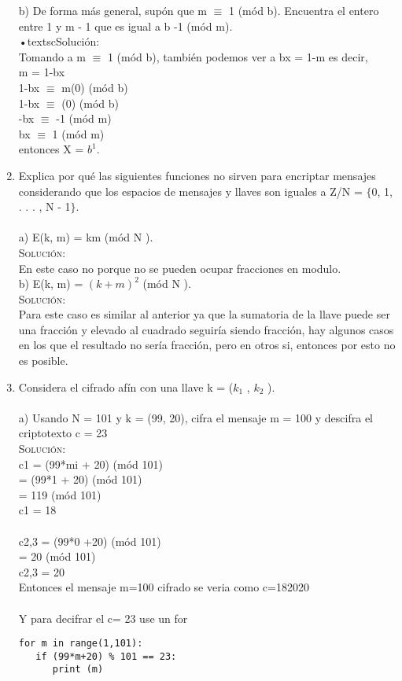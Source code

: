 \documentclass[letterpaper,10pt]{article}
\begin{document}
\begin{enumerate}
	b) De forma más general, supón que m $\equiv$ 1 (mód b). Encuentra el entero
entre 1 y m - 1 que es igual a b -1 (mód m).\\
	\textsc{•}textsc{Solución:}
	\\
	Tomando a m $\equiv$ 1 (mód b), también podemos ver a bx = 1-m es decir, \\
m = 1-bx\\
1-bx $\equiv$ m(0) (mód b)\\
1-bx $\equiv$ (0) (mód b)\\
-bx $\equiv$ -1 (mód m)\\
bx $\equiv$ 1 (mód m)\\
entonces X = $b^{1}$.\\
   	    
    \item Explica por qué las siguientes funciones no sirven para encriptar mensajes
considerando que los espacios de mensajes y llaves son iguales a Z/N =
$\lbrace$0, 1, . . . , N - 1$\rbrace$.
     \\ \\
    a) E(k, m) = km (mód N ).\\
    \textsc{Solución:}
	\\
	En este caso no porque no se pueden ocupar fracciones en modulo.\\
	
	b) E(k, m) = $(k + m)^{2}$ (mód N ).    \\
	\textsc{Solución:}
	\\
	Para este caso es similar al anterior ya que la sumatoria de la llave puede ser una fracción y elevado al cuadrado seguiría siendo fracción,
	hay algunos casos en los que el resultado no sería fracción, pero en otros si, entonces por esto no es posible.\\
   	    
    \item Considera el cifrado afín con una llave k = ($k_{1}$ , $k_{2}$ ).
     \\ \\
    a) Usando N = 101 y k = (99, 20), cifra el mensaje m = 100 y descifra el
criptotexto c = 23   \\  
    \textsc{Solución:}
	\\    
c1 = (99*mi + 20) (mód 101)\\
   = (99*1 + 20) (mód 101)\\
   = 119 (mód 101)\\
c1 = 18\\
\\
c2,3 = (99*0 +20) (mód 101)\\
     = 20 (mód 101)\\
c2,3 = 20\\
Entonces el mensaje m=100 cifrado se veria como c=182020 \\
\\
Y para decifrar el c= 23 use un for\\
\begin{lstlisting}
for m in range(1,101):
   if (99*m+20) % 101 == 23:
      print (m)
    \end{lstlisting}


\end{enumerate}
\end{document}
